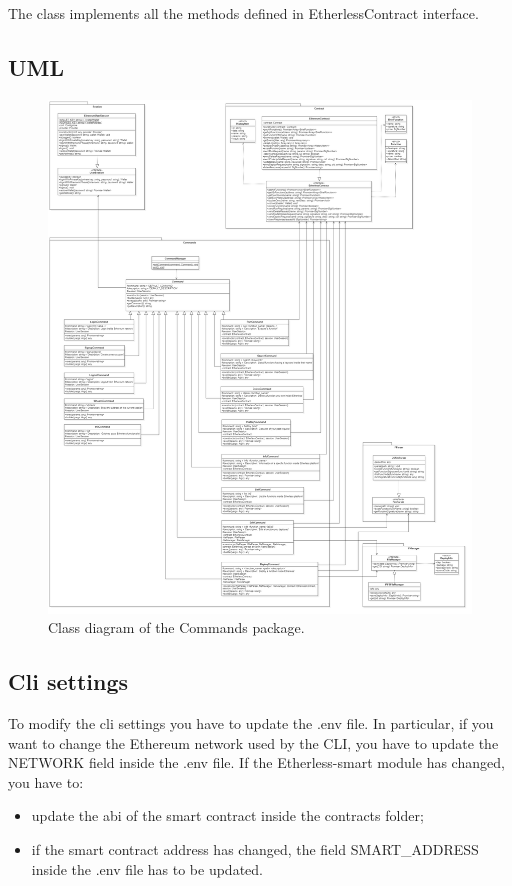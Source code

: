 					The class implements all the methods defined in EtherlessContract interface.

	\subsection{UML}
	\begin{figure} [H]
		\centering
		\includegraphics[width=0.85\linewidth]{diagrammi/etherless-cli/Classi}
		\caption{Class diagram of the Commands package.}
	\end{figure}

\subsection{Cli settings}
To modify the cli settings you have to update the .env file. In particular, if you want to change the Ethereum network used by the CLI, you have to update the NETWORK field inside the .env file.
If the Etherless-smart module has changed, you have to:
\begin{itemize}
	\item update the abi of the smart contract inside the contracts folder;
	\item if the smart contract address has changed, the field SMART\_ADDRESS inside the .env file has to be updated.
\end{itemize}

